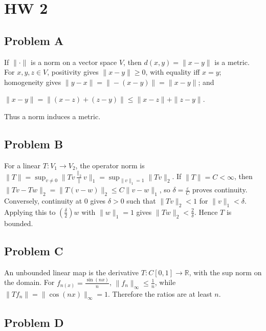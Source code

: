 \chapter{HW 2}

\section{Problem A}

If \(\| \cdot \|\) is a norm on a vector space \(V\), then \(d\left( {x,y} \right) = \| x - y\|\) is a metric. For \(x,y,z \in V\), positivity gives \(\| x - y\| \geq 0\), with equality iff \(x = y\); homogeneity gives \(\| y - x\| = \| - \left( {x - y} \right)\| = \| x - y\|\); and

\(\| x - y\| = \|\left( {x - z} \right) + \left( {z - y} \right)\| \leq \| x - z\| + \| z - y\|.\)

Thus a norm induces a metric.

\section{Problem B}

For a linear \(T:V_{1}\rightarrow V_{2}\), the operator norm is \(\| T\| = \sup_{v \neq 0}\| Tv\frac{\|_{2}}{\|}v\|_{1} = \sup_{\| v\|_{1} = 1}\| Tv\|_{2}\). If \(\| T\| = C < \infty\), then \(\| Tv - Tw\|_{2} = \| T\left( {v - w} \right)\|_{2} \leq C\| v - w\|_{1}\), so \(\delta = \frac{\varepsilon}{C}\) proves continuity. Conversely, continuity at \(0\) gives \(\delta > 0\) such that \(\| Tv\|_{2} < 1\) for \(\| v\|_{1} < \delta\). Applying this to \(\left( \frac{\delta}{2} \right)w\) with \(\| w\|_{1} = 1\) gives \(\| Tw\|_{2} < \frac{2}{\delta}\). Hence \(T\) is bounded.

\section{Problem C}

An unbounded linear map is the derivative \(T:C\left\lbrack {0,1} \right\rbrack\rightarrow\mathbb{R}\), with the sup norm on the domain. For \(f_{n{(x)}} = \frac{\sin\left( {nx} \right)}{n}\), \(\| f_{n}\|_{\infty} \leq \frac{1}{n}\), while \(\| Tf_{n}\| = \|\cos\left( {nx} \right)\|_{\infty} = 1\). Therefore the ratios are at least \(n\).

\section{Problem D}

